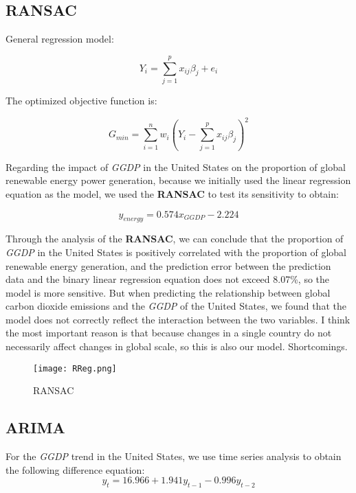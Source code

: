 \documentclass[12pt]{article}
\begin{document}
	
	\subsection{RANSAC}
	
	General regression model: 
	
	\begin{equation}\label{}
		Y_{i}=\sum_{j=1}^{p} x_{ij}\beta _{j}+e_{i}
	\end{equation}

	
	The optimized objective function is:
	
	\begin{equation}\label{}
		G_{min}=\sum_{i=1}^{n}w_{i}(Y_{i}-\sum_{j=1}^{p}x_{ij}\beta _{j} ) ^{2}
	\end{equation}
	
	Regarding the impact of \textit{GGDP} in the United States on the proportion of global renewable energy power generation, because we initially used the linear regression equation as the model, we used the \textbf{RANSAC} to test its sensitivity to obtain:
	
	\begin{equation}\label{}
		y_{energy} = 0.574x_{GGDP} -2.224	
	\end{equation}
	 
	 Through the analysis of the \textbf{RANSAC}, we can conclude that the proportion of \textit{GGDP} in the United States is positively correlated with the proportion of global renewable energy generation, and the prediction error between the prediction data and the binary linear regression equation does not exceed 8.07\%, so the model is more sensitive.
	 But when predicting the relationship between global carbon dioxide emissions and the \textit{GGDP} of the United States, we found that the model does not correctly reflect the interaction between the two variables.
	 I think the most important reason is that because changes in a single country do not necessarily affect changes in global scale, so this is also our model. Shortcomings.
	
	\begin{figure}[!htbp]
		\centering
		\texttt{[image: RReg.png]}
		\caption{RANSAC}\label{}
	\end{figure}
	
	\subsection{ARIMA}
	
	For the \textit{GGDP} trend in the United States, we use time series analysis to obtain the following difference equation: 
	\begin{equation}\label{}
		y_{t}=16.966+1.941y_{t-1}-0.996y_{t-2}
	\end{equation}
\end{document}
